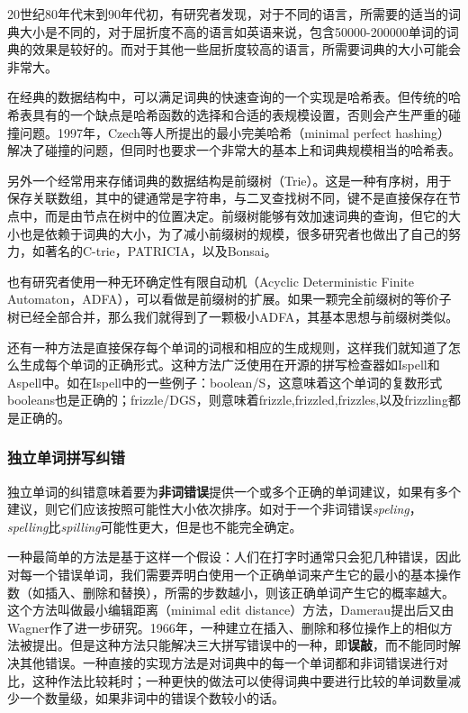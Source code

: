 \documentclass[UTF8,a4paper]{ctexart}
\begin{document}
20世纪80年代末到90年代初，有研究者发现，对于不同的语言，所需要的适当的词典大小是不同的，对于屈折度不高的语言如英语来说，包含50000-200000单词的词典的效果是较好的\cite{damerau1989examination,damerau1990evaluating,peterson1986note}。而对于其他一些屈折度较高的语言，所需要词典的大小可能会非常大。

在经典的数据结构中，可以满足词典的快速查询的一个实现是哈希表\cite{knuthart}。但传统的哈希表具有的一个缺点是哈希函数的选择和合适的表规模设置，否则会产生严重的碰撞问题。1997年，Czech等人\cite{czech1997perfect}所提出的最小完美哈希（minimal perfect hashing）解决了碰撞的问题，但同时也要求一个非常大的基本上和词典规模相当的哈希表。

另外一个经常用来存储词典的数据结构是前缀树（Trie）\cite{knuthart}。这是一种有序树，用于保存关联数组，其中的键通常是字符串，与二叉查找树不同，键不是直接保存在节点中，而是由节点在树中的位置决定。前缀树能够有效加速词典的查询，但它的大小也是依赖于词典的大小，为了减小前缀树的规模，很多研究者也做出了自己的努力，如著名的C-trie\cite{maly1976compressed}，PATRICIA\cite{morrison1968patricia}，以及Bonsai\cite{darragh1993bonsai}。

也有研究者使用一种无环确定性有限自动机（Acyclic Deterministic Finite Automaton，ADFA）\cite{deorowicz2005correcting}，可以看做是前缀树的扩展。如果一颗完全前缀树的等价子树已经全部合并，那么我们就得到了一颗极小ADFA，其基本思想与前缀树类似。

还有一种方法是直接保存每个单词的词根和相应的生成规则，这样我们就知道了怎么生成每个单词的正确形式。这种方法广泛使用在开源的拼写检查器如Ispell\cite{gorin19712003}和Aspell\cite{atkinson2011gnu}中。如在Ispell中的一些例子：boolean/S，这意味着这个单词的复数形式booleans也是正确的；frizzle/DGS，则意味着frizzle,frizzled,frizzles,以及frizzling都是正确的。

\subsubsection{独立单词拼写纠错}
独立单词的纠错意味着要为\textbf{非词错误}提供一个或多个正确的单词建议，如果有多个建议，则它们应该按照可能性大小依次排序。如对于一个非词错误\textit{speling}，\textit{spelling}比\textit{spilling}可能性更大，但是也不能完全确定。

一种最简单的方法是基于这样一个假设：人们在打字时通常只会犯几种错误，因此对每一个错误单词，我们需要弄明白使用一个正确单词来产生它的最小的基本操作数（如插入、删除和替换），所需的步数越小，则该正确单词产生它的概率越大。这个方法叫做最小编辑距离（minimal edit distance）方法\cite{damerau1964technique}，Damerau提出后又由Wagner作了进一步研究\cite{wagner1974string}。1966年，一种建立在插入、删除和移位操作上的相似方法被提出\cite{levenshtein1966binary}。但是这种方法只能解决三大拼写错误中的一种，即\textbf{误敲}，而不能同时解决其他错误。一种直接的实现方法是对词典中的每一个单词都和非词错误进行对比，这种作法比较耗时；一种更快的做法\cite{baeza1998fast}可以使得词典中要进行比较的单词数量减少一个数量级，如果非词中的错误个数较小的话。
\end{document}

